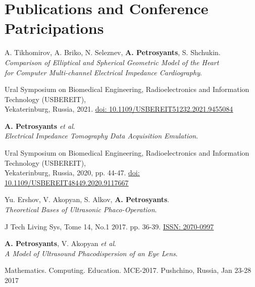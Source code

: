 \section{Publications and Conference Patricipations}
\resumeSubHeadingListStart

\resumeProjectHeading
  {A. Tikhomirov, A. Briko, N. Seleznev, \textbf{A. Petrosyants}, S. Shchukin.\\
  \textit{Comparison of Elliptical and Spherical Geometric
  Model of the Heart}\\
  \textit{for Computer Multi-channel Electrical Impedance Cardiography}.}{}
      \begin{itemize}[leftmargin=0in, label={}]
        \small{\item{
          {Ural Symposium on Biomedical Engineering, Radioelectronics and Information Technology (USBEREIT), \\ 
          Yekaterinburg, Russia, 2021.}
        {\href{https://ieeexplore.ieee.org/document/9455084/}{\underline{doi: 10.1109/USBEREIT51232.2021.9455084}}}
        }}
      \end{itemize}

\resumeProjectHeading
    {\textbf{A. Petrosyants} \textit{et al}.\\
  \textit{Electrical Impedance Tomography Data Acquisition Emulation}.}{}
      \begin{itemize}[leftmargin=0in, label={}]
      \small{\item{
        {Ural Symposium on Biomedical Engineering, Radioelectronics and Information Technology (USBEREIT), \\ 
              Yekaterinburg, Russia, 2020, pp. 44-47.}
        {\href{https://ieeexplore.ieee.org/abstract/document/9117667/}{\underline{doi: 10.1109/USBEREIT48449.2020.9117667}}}
      }}
      \end{itemize}

  \resumeProjectHeading
      {Yu. Ershov, V. Akopyan, S. Alkov, \textbf{A. Petrosyants}.\\
    \textit{Theoretical Bases of Ultrasonic Phaco-Operation}.}{}
        \begin{itemize}[leftmargin=0in, label={}]
        \small{\item{ 
          {J Tech Living Sys, Tome 14, No.1 2017. pp. 36-39. \href{https://www.elibrary.ru/item.asp?id=29715174}{\underline{ISSN: 2070-0997}}}
            }}
      \end{itemize}

  \resumeProjectHeading
    {\textbf{A. Petrosyants}, V. Akopyan \textit{et al}.\\
  \textit{A Model of Ultrasound Phacodispersion of an Eye Lens}.}{}
      \begin{itemize}[leftmargin=0in, label={}]
     \small{\item{ 
              {Mathematics. Computing. Education. MCE-2017. Pushchino, Russia, Jan 23-28 2017}
      }}
      \end{itemize}

